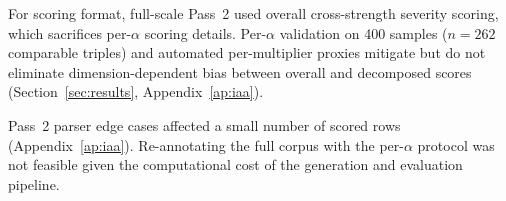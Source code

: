 For scoring format, full-scale Pass~2 used overall cross-strength severity scoring, which sacrifices per-$\alpha$ scoring details.
Per-$\alpha$ validation on 400 samples ($n{=}262$ comparable triples) and automated per-multiplier proxies mitigate but do not eliminate dimension-dependent bias between overall and decomposed scores (Section~\ref{sec:results}, Appendix~\ref{ap:iaa}).

Pass~2 parser edge cases affected a small number of scored rows (Appendix~\ref{ap:iaa}).
Re-annotating the full corpus with the per-$\alpha$ protocol was not feasible given the computational cost of the generation and evaluation pipeline.
